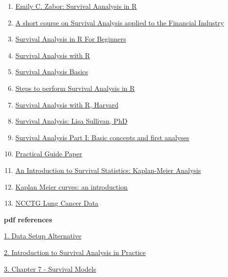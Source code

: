 \documentclass[
]{book}
\begin{document}
\begin{enumerate}
\def\labelenumi{\arabic{enumi}.}
\item
  \href{https://www.emilyzabor.com/tutorials/survival_analysis_in_r_tutorial.html}{Emily C. Zabor: Survival Aanalysis in R}
\item
  \href{https://bookdown.org/sestelo/sa_financial/}{A short course on Survival Analysis applied to the Financial Industry}
\item
  \href{https://www.datacamp.com/tutorial/survival-analysis-R}{Survival Analysis in R For Beginners}
\item
  \href{https://rviews.rstudio.com/2017/09/25/survival-analysis-with-r/}{Survival Analysis with R}
\item
  \href{http://www.sthda.com/english/wiki/survival-analysis-basics}{Survival Analysis Basics}
\item
  \href{https://www.r-bloggers.com/2018/03/steps-to-perform-survival-analysis-in-r/}{Steps to perform Survival Analysis in R}
\item
  \href{http://tagteam.harvard.edu/hub_feeds/1981/feed_items/2286128}{Survival Analysis with R, Harvard}
\item
  \href{https://sphweb.bumc.bu.edu/otlt/MPH-Modules/BS/BS704_Survival/BS704_Survival_print.html}{Survival Analysis: Lisa Sullivan, PhD}
\item
  \href{https://www.nature.com/articles/6601118.pdf}{Survival Analysis Part I: Basic concepts and first analyses}
\item
  \href{https://www.ncbi.nlm.nih.gov/pmc/articles/PMC3932959/pdf/nihms549224.pdf}{Practical Guide Paper}
\item
  \href{https://www.ncbi.nlm.nih.gov/pmc/articles/PMC5045282/}{An Introduction to Survival Statistics: Kaplan-Meier Analysis}
\item
  \href{https://towardsdatascience.com/kaplan-meier-curves-c5768e349479}{Kaplan Meier curves: an introduction}
\item
  \href{https://stat.ethz.ch/R-manual/R-devel/library/survival/html/lung.html}{NCCTG Lung Cancer Data}
\end{enumerate}

\textbf{pdf references}

\href{survival_pdf/survival_data_setup_alternative.pdf}{1. Data Setup Alternative}

\href{survival_pdf/survival_Intro_Survival_Analysis_Practice.pdf}{2. Introduction to Survival Analysis in Practice}

\href{survival_pdf/survival_lecture_note.pdf}{3. Chapter 7 - Survival Models}
\end{document}
